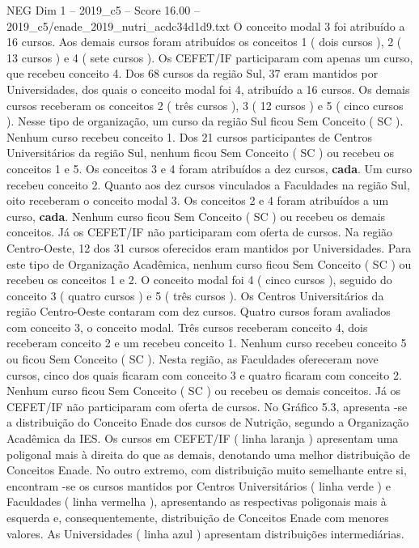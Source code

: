 \begin{textsample}{NEG Dim 1 – 2019\_c5 – Score 16.00 – 2019\_c5/enade\_2019\_nutri\_acdc34d1d9.txt}
O conceito modal 3 foi atribuído a 16 cursos.
Aos demais cursos foram atribuídos os conceitos 1 ( dois cursos ), 2 ( 13 cursos ) e 4 ( sete cursos ).
Os CEFET/IF participaram com apenas um curso, que recebeu conceito 4.
Dos 68 cursos da região Sul, 37 eram mantidos por Universidades, dos quais o conceito modal foi 4, atribuído a 16 cursos.
Os demais cursos receberam os conceitos 2 ( três cursos ), 3 ( 12 cursos ) e 5 ( cinco cursos ).
Nesse tipo de organização, um curso da região Sul ficou Sem Conceito ( SC ).
Nenhum curso recebeu conceito 1.
Dos 21 cursos participantes de Centros Universitários da região Sul, nenhum ficou Sem Conceito ( SC ) ou recebeu os conceitos 1 e 5.
Os conceitos 3 e 4 foram atribuídos a dez cursos, \textbf{cada}.
Um curso recebeu conceito 2.
Quanto aos dez cursos vinculados a Faculdades na região Sul, oito receberam o conceito modal 3.
Os conceitos 2 e 4 foram atribuídos a um curso, \textbf{cada}.
Nenhum curso ficou Sem Conceito ( SC ) ou recebeu os demais conceitos.
Já os CEFET/IF não participaram com oferta de cursos.
Na região Centro-Oeste, 12 dos 31 cursos oferecidos eram mantidos por Universidades.
Para este tipo de Organização Acadêmica, nenhum curso ficou Sem Conceito ( SC ) ou recebeu os conceitos 1 e 2.
O conceito modal foi 4 ( cinco cursos ), seguido do conceito 3 ( quatro cursos ) e 5 ( três cursos ).
Os Centros Universitários da região Centro-Oeste contaram com dez cursos.
Quatro cursos foram avaliados com conceito 3, o conceito modal.
Três cursos receberam conceito 4, dois receberam conceito 2 e um recebeu conceito 1.
Nenhum curso recebeu conceito 5 ou ficou Sem Conceito ( SC ).
Nesta região, as Faculdades ofereceram nove cursos, cinco dos quais ficaram com conceito 3 e quatro ficaram com conceito 2.
Nenhum curso ficou Sem Conceito ( SC ) ou recebeu os demais conceitos.
Já os CEFET/IF não participaram com oferta de cursos.
No Gráfico 5.3, apresenta -se a distribuição do Conceito Enade dos cursos de Nutrição, segundo a Organização Acadêmica da IES.
Os cursos em CEFET/IF ( linha laranja ) apresentam uma poligonal mais à direita do que as demais, denotando uma melhor distribuição de Conceitos Enade.
No outro extremo, com distribuição muito semelhante entre si, encontram -se os cursos mantidos por Centros Universitários ( linha verde ) e Faculdades ( linha vermelha ), apresentando as respectivas poligonais mais à esquerda e, consequentemente, distribuição de Conceitos Enade com menores valores.
As Universidades ( linha azul ) apresentam distribuições intermediárias.

\end{textsample}
